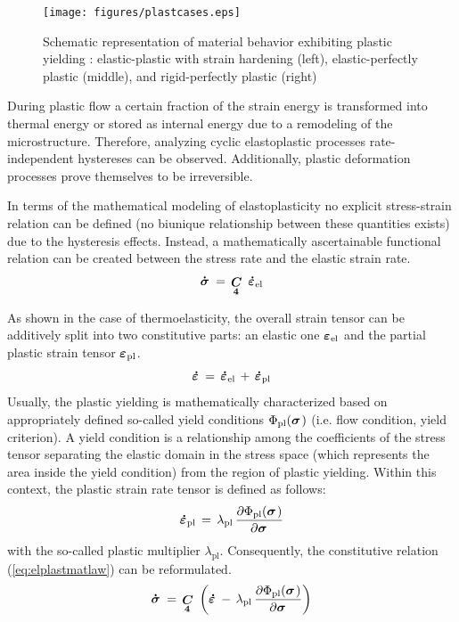 \begin{figure}[htb!]
\begin{center}
\footnotesize
\texttt{[image: figures/plastcases.eps]}
\caption{Schematic representation of material behavior exhibiting plastic yielding \cite{JCZ:2007}: elastic-plastic with
strain hardening (left), elastic-perfectly plastic (middle), and rigid-perfectly plastic (right)}
\label{fig:plastcases}
\end{center}
\end{figure}

During plastic flow a certain fraction of the strain energy is transformed into thermal energy or stored as internal energy due to a
remodeling of the microstructure. Therefore, analyzing cyclic elastoplastic processes rate-independent hystereses can be observed.
Additionally, plastic deformation processes prove themselves to be irreversible.

In terms of the mathematical modeling of elastoplasticity no explicit stress-strain relation can be defined (no biunique relationship
between these quantities exists) due to the hysteresis effects. Instead, a mathematically ascertainable functional relation can be created
between the stress rate and the elastic strain rate.
\begin{equation}
\miu{\sigma}{}{\dot}\,=\,\fourtens{C}\,\miu{\varepsilon}{\mathrm{el}}{\dot}
\label{eq:elplastmatlaw}
\end{equation}

As shown in the case of thermoelasticity, the overall strain tensor can be additively split into two constitutive parts: an elastic one
$\mbox{${\mbox{\boldmath${\varepsilon}$\unboldmath}}_{\:\!\mathrm{el}}$}$ and the partial plastic strain tensor $\mbox{${\mbox{\boldmath${\varepsilon}$\unboldmath}}_{\:\!\mathrm{pl}}$}$.
\begin{equation}
\miu{\varepsilon}{}{\dot}\,=\,\miu{\varepsilon}{\mathrm{el}}{\dot}\,+\,\miu{\varepsilon}{\mathrm{pl}}{\dot}
\label{eq:strainsplit_pl}
\end{equation}
Usually, the plastic yielding is mathematically characterized based on appropriately defined so-called yield conditions $\Phi_{\mathrm{pl}}(\mbox{${\mbox{\boldmath${\sigma}$\unboldmath}}_{\:\!}$})$ (i.e. flow condition, yield criterion). A yield condition is a relationship among the coefficients of the stress tensor separating the elastic domain in the stress space (which represents the area inside the yield condition) from the region of plastic yielding. Within this context, the plastic strain rate tensor is defined as follows:
\begin{equation}
\miu{\varepsilon}{\mathrm{pl}}{\dot}\,=\,
\lambda_{\mathrm{pl}}\,\frac{\partial\Phi_{\mathrm{pl}}(\miu{\sigma}{}{})}{\partial\miu{\sigma}{}{}}
\label{eq:plaststrainrate}
\end{equation}
with the so-called plastic multiplier $\lambda_{\mathrm{pl}}$. Consequently, the constitutive relation (\ref{eq:elplastmatlaw}) can be
reformulated. 
\begin{equation}
\miu{\sigma}{}{\dot}\,=\,\fourtens{C}
\left(\miu{\varepsilon}{}{\dot}\,-\,
\lambda_{\mathrm{pl}}\,\frac{\partial\Phi_{\mathrm{pl}}(\miu{\sigma}{}{})}{\partial\miu{\sigma}{}{}}
\right)
\label{eq:elplastmatlawmod}
\end{equation}

